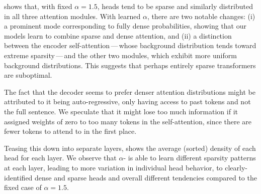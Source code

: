  shows that, with fixed $\alpha=1.5$, heads
tend to be sparse and similarly distributed in all three attention
modules. With learned $\alpha$, there are two notable changes: (i) a
prominent mode corresponding to fully dense probabilities, showing
that our models learn to combine sparse and dense attention, and (ii)
a distinction between the encoder self-attention\,---\,whose background
distribution tends toward extreme sparsity\,---\,and the other two
modules, which exhibit more uniform background distributions. This
suggests that perhaps entirely sparse transformers are suboptimal.

The fact that the decoder seems to prefer denser attention
distributions might be attributed to it being auto-regressive, only
having access to past tokens and not the full sentence. We speculate
that it might lose too much information if it assigned weights of
zero to too many tokens in the self-attention, since there are fewer
tokens to attend to in the first place.

Teasing this down into separate layers,
 shows the average (sorted) density of
each head for each layer. We observe that $\alpha$-\entmaxtext{} is
able to learn different sparsity patterns at each layer, leading to
more variation in individual head behavior, to clearly-identified
dense and sparse heads and overall different tendencies compared
to the fixed case of $\alpha=1.5$.

